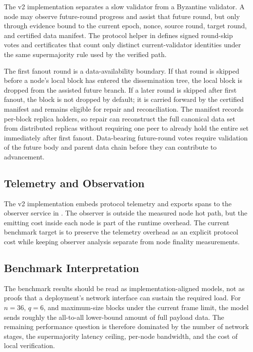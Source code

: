 The v2 implementation separates a slow validator from a Byzantine validator.
A node may observe future-round progress and assist that future round, but only
through evidence bound to the current epoch, nonce, source round, target round,
and certified data manifest. The protocol helper in 
defines signed round-skip votes and certificates that count only distinct
current-validator identities under the same supermajority rule used by the
verified path.

The first fanout round is a data-availability boundary. If that round is
skipped before a node's local block has entered the dissemination tree, the
local block is dropped from the assisted future branch. If a later round is
skipped after first fanout, the block is not dropped by default; it is carried
forward by the certified manifest and remains eligible for repair and
reconciliation. The manifest records per-block replica holders, so repair can
reconstruct the full canonical data set from distributed replicas without
requiring one peer to already hold the entire set immediately after first
fanout. Data-bearing future-round votes require validation of the future body
and parent data chain before they can contribute to advancement.

\subsection{Telemetry and Observation}

The v2 implementation embeds protocol telemetry and exports spans to the
observer service in . The observer is outside the
measured node hot path, but the emitting cost inside each node is part of the
runtime overhead. The current benchmark target is to preserve the telemetry
overhead as an explicit protocol cost while keeping observer analysis separate
from node finality measurements.

\subsection{Benchmark Interpretation}

The benchmark results should be read as implementation-aligned models, not as
proofs that a deployment's network interface can sustain the required load. For
\(n=36\), \(q=6\), and maximum-size blocks under the current frame limit, the
model sends roughly the all-to-all lower-bound amount of full payload data. The
remaining performance question is therefore dominated by the number of network
stages, the supermajority latency ceiling, per-node bandwidth, and the cost of
local verification.
